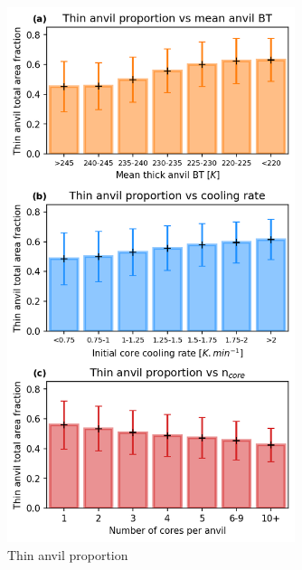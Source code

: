 \begin{figure}[tp]
    \centering
    \includegraphics[width=0.75\textwidth]{figures/ch2_20.png}
    \caption{Thin anvil proportion}
    \label{fig:thin_anvil_proportion}
\end{figure}

